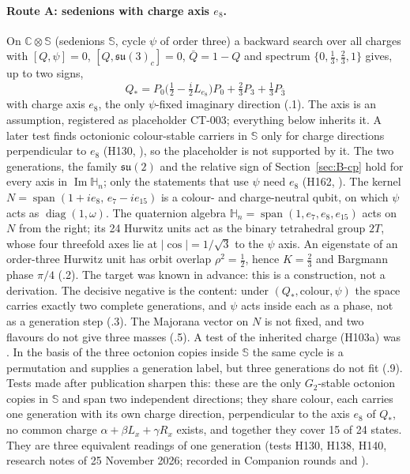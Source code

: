 \paragraph{Route A: sedenions with charge axis $e_8$.}
On $\mathbb C\otimes\mathbb S$ (sedenions $\mathbb S$, cycle $\psi$ of order three) a backward search over all charges with
$[Q,\psi]=0$, $[Q,\mathfrak{su}(3)_c]=0$, $\bar Q=1-Q$ and spectrum $\{0,\tfrac13,\tfrac23,1\}$ gives, up to two signs,
\begin{equation}
 Q_*=P_0\bigl(\tfrac12-\tfrac i2L_{e_8}\bigr)P_0+\tfrac23P_3+\tfrac13P_{\bar3}
 \label{eq:B-Qstar}
\end{equation}
with charge axis $e_8$, the only $\psi$-fixed imaginary direction (.1). The axis is an assumption, registered
as placeholder CT-003; everything below inherits it. A later test finds octonionic colour-stable carriers in $\mathbb S$ only for charge
directions perpendicular to $e_8$ (H130, ), so the placeholder is not supported by it. The two generations, the family $\mathfrak{su}(2)$ and the relative sign of
Section~\ref{sec:B-cp} hold for every axis in $\operatorname{Im}\mathbb H_n$; only the statements that use $\psi$ need $e_8$ (H162, ). The kernel $N=\operatorname{span}(1+ie_8,\,e_7-ie_{15})$ is a colour-
and charge-neutral qubit, on which $\psi$ acts as $\operatorname{diag}(1,\omega)$. The quaternion algebra
$\mathbb H_n=\operatorname{span}(1,e_7,e_8,e_{15})$ acts on $N$ from the right; its 24 Hurwitz units act as the binary
tetrahedral group $2T$, whose four threefold axes lie at $|\cos|=1/\sqrt3$ to the $\psi$ axis. An eigenstate of an
order-three Hurwitz unit has orbit overlap $\rho^2=\tfrac12$, hence $K=\tfrac23$ and Bargmann phase $\pi/4$ (.2).
The target was known in advance: this is a construction, not a derivation. The decisive negative is the content: under
$(Q_*,\text{colour},\psi)$ the space carries exactly two complete generations, and $\psi$ acts inside each as a phase, not as a
generation step (.3). The Majorana vector on $N$ is not fixed, and two flavours do not give three masses
(.5). A test of the inherited charge (H103a) was \Refuted. In the basis of the three octonion copies inside
$\mathbb S$ the same cycle is a permutation and supplies a generation label, but three generations do not fit
(.9). Tests made after publication sharpen this: these are the only $G_2$-stable octonion copies in $\mathbb S$ and
span two independent directions; they share colour, each carries one generation with its own charge direction, perpendicular
to the axis $e_8$ of $Q_*$, no common charge $\alpha+\beta L_x+\gamma R_x$ exists, and together they cover 15 of 24 states. They are three
equivalent readings of one generation (tests H130, H138, H140, research notes of 25 November 2026; recorded in Companion
rounds  and ).

